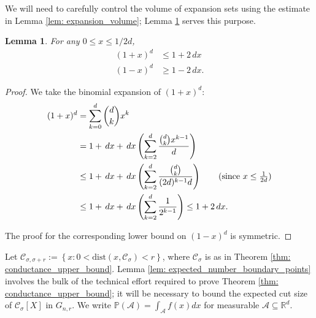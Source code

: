 \documentclass{article}
\newcommand{\set}[1]{\left\{#1\right\}}
\newcommand{\Reals}{\mathbb{R}}
\newcommand{\Rd}{\Reals^d}
\newcommand{\1}{\mathbf{1}}
\newcommand{\dist}{\mathrm{dist}}
\newcommand{\Xbf}{X}             %
\newcommand{\Pbb}{\mathbb{P}}
\newcommand{\Cset}{\mathcal{C}}
\newcommand{\Aset}{\mathcal{A}}
\newcommand{\Csig}{\Cset_{\sigma}}
\newcommand{\Csigr}{\Cset_{\sigma,\sigma + r}}
\newcommand{\dx}{\,dx}
\theoremstyle{aldenthm}
\newtheorem{lemma}{Lemma}
\theoremstyle{aldenrmrk}
\begin{document}
We will need to carefully control the volume of expansion sets using the estimate in Lemma \ref{lem: expansion_volume}; Lemma \ref{lem: Taylor_series} serves this purpose.
\begin{lemma}
	\label{lem: Taylor_series}
	For any $0 \leq x \leq 1/2d$,
	\begin{align*}
	(1 + x)^d & \leq 1 + 2\dx \\
	(1 - x)^d & \geq 1 - 2\dx.
	\end{align*}
\end{lemma}
\begin{proof}
	We take the binomial expansion of $(1 + x)^d$:
	\begin{align*}
	(1 + x)^d & = \sum_{k = 0}^{d} {d \choose k} x^k \\
	& = 1 + \dx + \dx\left(\sum_{k = 2}^d \frac{{d \choose k} x^{k - 1}}{d}\right)\\
	& \leq 1 + \dx + \dx\left(\sum_{k = 2}^d \frac{{d \choose k}}{(2d)^{k-1}d}\right) \tag{since $x \leq \frac{1}{2d}$} \\
	& \leq 1 + \dx + \dx\left(\sum_{k = 2}^d \frac{1}{2^{k - 1}}\right) \leq 1 + 2\dx.
	\end{align*}
	
	The proof for the corresponding lower bound on $(1 - x)^d$ is symmetric.
\end{proof}

Let $\Csigr := \set{x: 0 < \dist(x, \Csig) < r}$, where $\Csig$ is as in Theorem \ref{thm: conductance_upper_bound}. Lemma \ref{lem: expected_number_boundary_points} involves the bulk of the technical effort required to prove Theorem \ref{thm: conductance_upper_bound}; it will be necessary to bound the expected cut size of $\Csig[\Xbf]$ in $G_{n,r}$. We write $\Pbb(\Aset) = \int_{\Aset} f(x) dx$ for measurable $\Aset \subseteq \Rd$.
\end{document}
